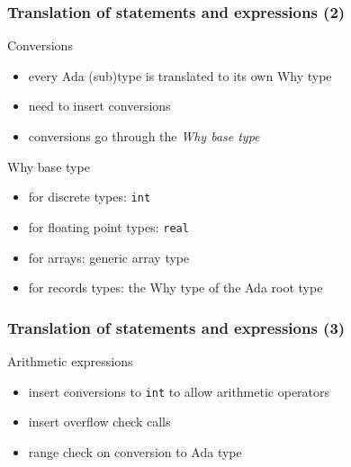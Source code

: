 \documentclass{beamer}
\newenvironment{specialframe}{%
  \begin{frame}[fragile,environment=specialframe]}{\end{frame}}
\begin{document}
\begin{specialframe}\frametitle{Translation of statements and expressions (2) }
   \begin{block}{Conversions}
      \begin{itemize}
         \item every Ada (sub)type is translated to its own Why type
         \item need to insert conversions
         \item conversions go through the \emph{Why base type}
      \end{itemize}
   \end{block}
   \begin{block}{Why base type}
      \begin{itemize}
         \item for discrete types: \verb|int|
         \item for floating point types: \verb|real|
         \item for arrays: generic array type
         \item for records types: the Why type of the Ada root type
      \end{itemize}
   \end{block}
\end{specialframe}

\begin{specialframe}\frametitle{Translation of statements and expressions (3) }
   \begin{block}{Arithmetic expressions}
      \begin{itemize}
         \item insert conversions to \verb|int| to allow arithmetic operators
         \item insert overflow check calls
         \item range check on conversion to Ada type
      \end{itemize}
   \end{block}
\end{specialframe}
\end{document}
